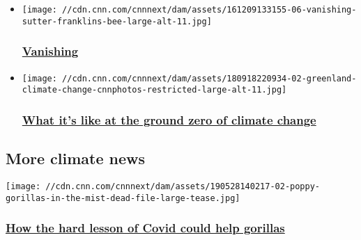 \begin{itemize}
\item
  \href{https://www.cnn.com/interactive/2016/12/specials/vanishing/}{}

  \texttt{[image: //cdn.cnn.com/cnnnext/dam/assets/161209133155-06-vanishing-sutter-franklins-bee-large-alt-11.jpg]}

  \hypertarget{vanishing}{%
  \subsubsection{\texorpdfstring{\href{https://www.cnn.com/interactive/2016/12/specials/vanishing/}{Vanishing}}{Vanishing}}\label{vanishing}}
\end{itemize}

\begin{itemize}
\item
  \href{https://www.cnn.com/interactive/2018/09/world/greenland-climate-change-cnnphotos/}{}

  \texttt{[image: //cdn.cnn.com/cnnnext/dam/assets/180918220934-02-greenland-climate-change-cnnphotos-restricted-large-alt-11.jpg]}

  \hypertarget{what-its-like-at-the-ground-zero-of-climate-change}{%
  \subsubsection{\texorpdfstring{\href{https://www.cnn.com/interactive/2018/09/world/greenland-climate-change-cnnphotos/}{What
  it's like at the ground zero of climate
  change}}{What it's like at the ground zero of climate change}}\label{what-its-like-at-the-ground-zero-of-climate-change}}
\end{itemize}

\hypertarget{more-climate-news-}{%
\subsection{More climate news~}\label{more-climate-news-}}

\href{/2020/07/31/opinions/gorillas-conservation-covid-pandemic-stoinski/index.html}{}

\texttt{[image: //cdn.cnn.com/cnnnext/dam/assets/190528140217-02-poppy-gorillas-in-the-mist-dead-file-large-tease.jpg]}

\hypertarget{how-the-hard-lesson-of-covid-could-help-gorillas}{%
\subsubsection{\texorpdfstring{\href{/2020/07/31/opinions/gorillas-conservation-covid-pandemic-stoinski/index.html}{How
the hard lesson of Covid could help
gorillas}}{How the hard lesson of Covid could help gorillas}}\label{how-the-hard-lesson-of-covid-could-help-gorillas}}

